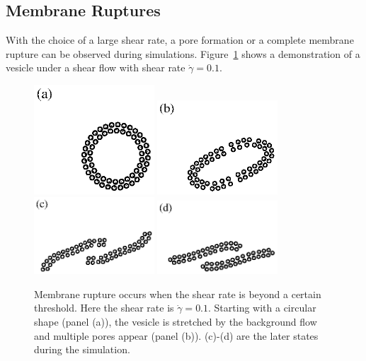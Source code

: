 \documentclass[lineno]{jfm}
\begin{document}
\subsection{Membrane Ruptures}

With the choice of a large shear rate, a pore formation or a complete membrane rupture can be observed during simulations. Figure~\ref{figure4} shows a demonstration of a vesicle under a shear flow with shear rate $\dot\gamma=0.1$.


\begin{figure}[H]
\begin{center}
\includegraphics[width=0.4\textwidth]{N58_rupt_0.eps}
\includegraphics[width=0.4\textwidth]{N58_rupt_200.eps}\\
\includegraphics[width=0.4\textwidth]{N58_rupt_400.eps}
\includegraphics[width=0.4\textwidth]{N58_rupt_600.eps}
\end{center}
  \caption{Membrane rupture occurs when the shear rate is beyond a certain threshold. Here the shear rate is $\dot\gamma = 0.1$. Starting with a circular shape (panel (a)), the vesicle is stretched by the background flow and multiple pores appear (panel (b)). (c)-(d) are the later states during the simulation.
  }
    \label{figure4}
\end{figure}
\end{document}
